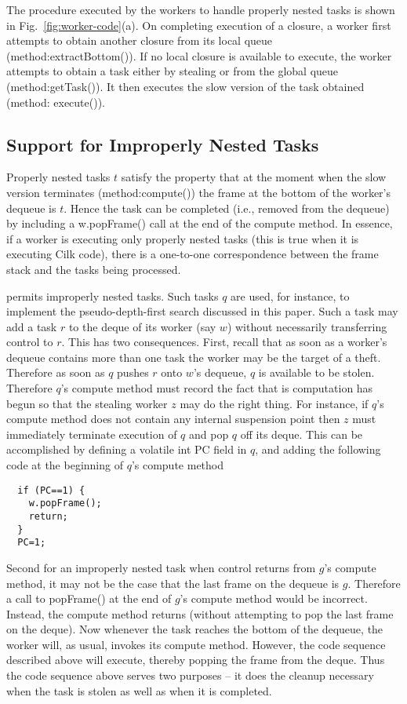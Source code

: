 The procedure executed by the workers to handle properly nested tasks
is shown in Fig.~\ref{fig:worker-code}(a). On completing execution of
a closure, a worker first attempts to obtain another closure from its
local queue (method:{\java extractBottom()}). If no local closure is
available to execute, the worker attempts to obtain a task either by
stealing or from the global queue (method:{\java getTask()}). It then
executes the slow version of the task obtained (method:{\java
  execute()}). 


\subsection{Support for Improperly Nested Tasks}

Properly nested tasks $t$ satisfy the property that at the moment when
the slow version terminates (method:{\java compute()}) the frame at
the bottom of the worker's dequeue is $t$. Hence the task can be
completed (i.e., removed from the dequeue) by including a {\java
w.popFrame()} call at the end of the compute method. In essence, if a
worker is executing only properly nested tasks (this is true when it
is executing Cilk code), there is a one-to-one correspondence between
the frame stack and the tasks being processed.

\Xten{} permits improperly nested tasks. Such tasks $q$ are used, for
instance, to implement the pseudo-depth-first search discussed in this
paper. Such a task may add a task $r$ to the deque of its worker (say $w$)
without necessarily transferring control to $r$. This has two
consequences. First, recall that as soon as a worker's dequeue
contains more than one task the worker may be the target of a
theft. Therefore as soon as $q$ pushes $r$ onto $w$'s dequeue, $q$ is
available to be stolen.  Therefore $q$'s compute method must record the
fact that is computation has begun so that the stealing worker $z$ may
do the right thing. For instance, if $q$'s compute method does not
contain any internal suspension point then $z$ must immediately
terminate execution of $q$ and pop $q$ off its deque. This can be
accomplished by defining a volatile int PC field in $q$, and adding the
following code at the beginning of $q$'s compute method

{\scriptsize
\begin{verbatim}
  if (PC==1) {
    w.popFrame();
    return;
  }
  PC=1;
\end{verbatim}
}

Second for an improperly nested task when control returns from $g$'s
compute method, it may not be the case that the last frame on the
dequeue is $g$. Therefore a call to {\java popFrame()} at the end of
$g$'s compute method would be incorrect. Instead, the compute method
returns (without attempting to pop the last frame on the deque). Now
whenever the task reaches the bottom of the dequeue, the worker will,
as usual, invokes its compute method. However, the code sequence
described above will execute, thereby popping the frame from the
deque. Thus the code sequence above serves two purposes -- it does the
cleanup necessary when the task is stolen as well as when it is
completed.

